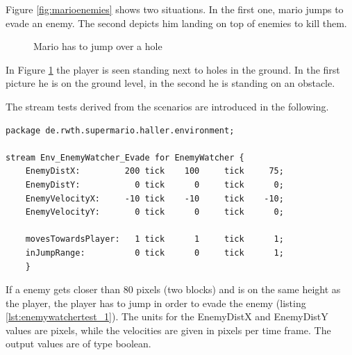 Figure \ref{fig:marioenemies} shows two situations. In the first one, mario jumps to evade an enemy. The second depicts him landing on top of enemies to kill them.

\begin{figure} 
	\centering
	\caption{Mario has to jump over a hole} 
	\label{fig:mariohole}
\end{figure} 
In Figure \ref{fig:mariohole} the player is seen standing next to holes in the ground. In the first picture he is on the ground level, in the second he is standing on an obstacle.

The stream tests derived from the scenarios are introduced in the following.
\begin{lstlisting}[label=lst:enemywatchertest_1, caption=Enemy watcher stream test, morekeywords={package, stream, tick, for},
frame=single, basicstyle=\small, float,floatplacement=H]
package de.rwth.supermario.haller.environment;

stream Env_EnemyWatcher_Evade for EnemyWatcher {
    EnemyDistX:         200 tick    100     tick     75;
    EnemyDistY:           0 tick      0     tick      0;
    EnemyVelocityX:     -10 tick    -10     tick    -10;
    EnemyVelocityY:       0 tick      0     tick      0;
            
    movesTowardsPlayer:   1 tick      1     tick      1;
    inJumpRange:          0 tick      0     tick      1;
    }
\end{lstlisting}
If a enemy gets closer than 80 pixels (two blocks) and is on the same height as the player, the player has to jump in order to evade the enemy (listing \ref{lst:enemywatchertest_1}). The units for the EnemyDistX and EnemyDistY values are pixels, while the velocities are given in pixels per time frame.
The output values are of type boolean.

